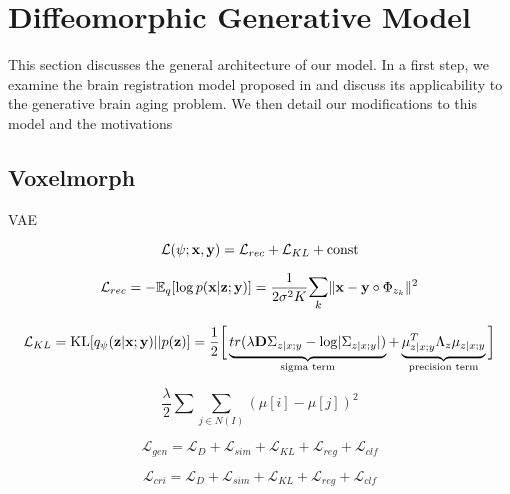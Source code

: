 \chapter{Diffeomorphic Generative Model}

This section discusses the general architecture of our model. In a first step, we examine the brain registration model proposed in \cite{voxelmorph} and discuss its applicability to the generative brain aging problem. We then detail our modifications to this model and the motivations

\section{Voxelmorph}

VAE

\begin{equation}
	\mathcal{L}(\psi; \bold{x}, \bold{y}) = \mathcal{L}_{rec} + \mathcal{L}_{KL} + \text{const} 
\end{equation}


\begin{equation}
	\mathcal{L}_{rec} = -\E_{q}[ \log p( \mathbf{x} | \mathbf{z}; \mathbf{y} ) ] 
	= \frac{1}{2 \sigma^2 K} \mathlarger{\sum_{k}} \norm{\mathbf{x} - \mathbf{y} \circ \Phi_{z_{k}}}^{2}
\end{equation}

\begin{equation}
	\mathcal{L}_{KL} = 
		\text{KL} [ q_{\psi} ( \mathbf{z} | \mathbf{x} ; \mathbf{y} ) || p ( \mathbf{z} ) ] = 
		\frac{1}{2} \bigg[
		\underbrace{
			tr( \lambda \mathbf{D} \Sigma_{z | x; y} - \log \abs{ \Sigma_{z | x; y} } ) \vphantom{\mu_{z | x; y}^{T}}
		}_{\text{sigma term}} +
		\underbrace{
			\mu_{z | x; y}^{T} \Lambda_{z} \mu_{z | x; y}
		}_{\text{precision term}} \bigg]
\end{equation}

\begin{equation}
	\frac{\lambda}{2} \sum \sum_{j \in N(I)} ( \mu[i] - \mu[j])^{2}
\end{equation}



\begin{equation}
	\mathcal{L}_{gen} = \mathcal{L}_{D} + \mathcal{L}_{sim} + \mathcal{L}_{KL} + \mathcal{L}_{reg} + \mathcal{L}_{clf} 
\end{equation}

\begin{equation}
	\mathcal{L}_{cri} = \mathcal{L}_{D} + \mathcal{L}_{sim} + \mathcal{L}_{KL} + \mathcal{L}_{reg} + \mathcal{L}_{clf} 
\end{equation}



